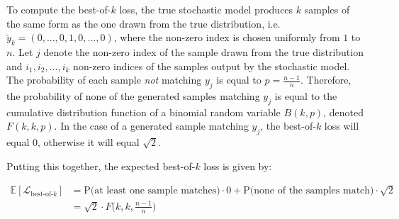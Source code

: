 \documentclass{article}
\begin{document}
To compute the best-of-$k$ loss, the true stochastic model produces $k$ samples of the same form as the one drawn from the true distribution, i.e. $\tilde{y}_k = (0, ..., 0, 1, 0, ..., 0)$, where the non-zero index is chosen uniformly from $1$ to $n$.
Let $j$ denote the non-zero index of the sample drawn from the true distribution and $i_1, i_2, ..., i_k$ non-zero indices of the samples output by the stochastic model.
The probability of each sample \textit{not} matching $y_j$ is equal to $p=\frac{n-1}{n}$.
Therefore, the probability of none of the generated samples matching $y_j$ is equal to the cumulative distribution function of a binomial random variable $B(k, p)$, denoted $F(k, k, p)$.
In the case of a generated sample matching $y_j$, the best-of-$k$ loss will equal 0, otherwise it will equal $\sqrt{2}$.

Putting this together, the expected best-of-$k$ loss is given by:

\begin{align}
  \mathbb{E}[\mathcal{L}_{\mbox{best-of-$k$}}] &= \mbox{P(at least one sample matches)}\cdot 0 + \mbox{P(none of the samples match)} \cdot \sqrt{2} \\
  &= \sqrt{2} \cdot F\Big (k, k, \frac{n-1}{n} \Big) \\
\end{align}
\end{document}
